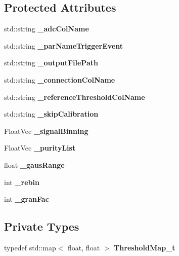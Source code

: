 \subsection*{Protected Attributes}
\begin{DoxyCompactItemize}
\item 
std::string {\bfseries \_\-adcColName}\label{classCALICE_1_1multiCalibrator_a2c6dadc7bd856f48ebabb2ff1f3eb24d}

\item 
std::string {\bfseries \_\-parNameTriggerEvent}\label{classCALICE_1_1multiCalibrator_a9dcf1a278390cf22a27f873b03ecaf42}

\item 
std::string {\bfseries \_\-outputFilePath}\label{classCALICE_1_1multiCalibrator_a243d6d66340eba9a2cadfa2387b20c0f}

\item 
std::string {\bfseries \_\-connectionColName}\label{classCALICE_1_1multiCalibrator_acd73797da60310a0a4bcfd495204a855}

\item 
std::string {\bfseries \_\-referenceThresholdColName}\label{classCALICE_1_1multiCalibrator_ac3f8d6ece5b4b56d26a9864ee0618ce5}

\item 
std::string {\bfseries \_\-skipCalibration}\label{classCALICE_1_1multiCalibrator_af3bb02c62940673fb59d5250cc294d6d}

\item 
FloatVec {\bfseries \_\-signalBinning}\label{classCALICE_1_1multiCalibrator_aa88fe075d6603ee3c78158bd742b91e4}

\item 
FloatVec {\bfseries \_\-purityList}\label{classCALICE_1_1multiCalibrator_a8d8b4bb7da03c22ddf35a8f94c7bb1a0}

\item 
float {\bfseries \_\-gausRange}\label{classCALICE_1_1multiCalibrator_a7fc0a223ac7ef8119b3b0a987eb44adc}

\item 
int {\bfseries \_\-rebin}\label{classCALICE_1_1multiCalibrator_a007fb7a565ad1ec0eb2719981203f8fe}

\item 
int {\bfseries \_\-granFac}\label{classCALICE_1_1multiCalibrator_a5dcaedfa4e29bad191bc22016eca0355}

\end{DoxyCompactItemize}
\subsection*{Private Types}
\begin{DoxyCompactItemize}
\item 
typedef std::map$<$ float, float $>$ {\bfseries ThresholdMap\_\-t}\label{classCALICE_1_1multiCalibrator_a35b415a32f3bf4f78a4bb5adc3f96470}

\end{DoxyCompactItemize}
